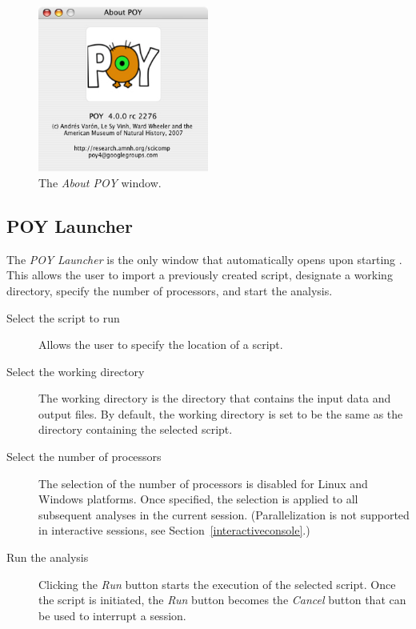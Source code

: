 \begin{figure}[htpb]
    \begin{center}
        \includegraphics[width=0.5\textwidth]{doc/figures/about_window.jpg}
    \end{center}
    \caption{The \emph{About POY} window.}
    \label{fig:about_window}
\end{figure}

\subsection{POY Launcher} 
The \emph{POY Launcher} is the only window that automatically opens upon starting
\poy. This allows the user to import a previously created script,
designate a working directory, specify the number of processors,
and start the analysis.

\begin{description}
	\item[Select the script to run]
     Allows the user to specify the location of a \poy script.
	\item[Select the working directory]
    The working directory is the
    directory that contains the input data and output files. By default, the working directory is set to be the same as the
    directory containing the selected \poy script. 
	\item[Select the number of processors]
    The selection of the number of processors is disabled for Linux
    and Windows platforms. Once specified, the selection is applied
    to all subsequent analyses in the current \poy session. (Parallelization is not supported in interactive sessions, see Section~\ref{interactiveconsole}.)
	\item[Run the analysis]
    Clicking the \emph{Run} button starts the execution of the selected
    script. Once the script is initiated, the \emph{Run} button
    becomes the \emph{Cancel} button that can be used to interrupt
    a \poy session.
\end{description}

